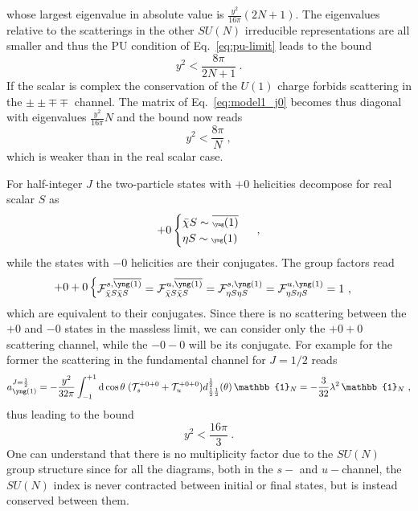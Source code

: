 \documentclass[a4paper,11pt]{article}
\newcommand{\be}{\begin{equation}}
\newcommand{\ee}{\end{equation}}
\newcommand{\nn}{\nonumber}
\begin{document}
whose largest eigenvalue in absolute value is $\frac{y^2}{16\pi}(2N+1)$. The eigenvalues relative to the scatterings in the other $SU(N)$ irreducible representations are all smaller and thus the PU condition of Eq.~\eqref{eq:pu-limit}  leads to the bound
\be
y^2 < \frac{8\pi}{2N+1}\ .
\ee
If the scalar is complex the conservation of the $U(1)$ charge forbids scattering in the $\pm\pm\mp\mp$ channel. The matrix of Eq.~\eqref{eq:model1_j0} becomes thus diagonal with eigenvalues $\frac{y^2}{16\pi} N$ and the bound now reads
\be\label{eq:model1_J0_complex}
y^2 < \frac{8 \pi}{N} \ ,
\ee
which is weaker than in the real scalar case. 

For half-integer $J$ the two-particle states with $+0$ helicities decompose for real scalar $S$ as
\be
+0
\begin{cases}
 \bar\chi S  \sim {\overline{{\tiny{\yng(1)}}}} \nn \\
 \eta S \sim {\tiny{\yng(1)}}
\end{cases}  \ ,
\ee
while the states with $-0$ helicities are their conjugates. The group factors read
\begin{align}\label{eq:group_model1_J12}
+0+0
\begin{cases}
{\cal F}^{s,{{\overline{\tiny{\yng(1)}}}}}_{\bar \chi S \bar \chi S} = {\cal F}^{u,{\overline{\tiny{\yng(1)}}}}_{\bar\chi S \bar\chi S} = {\cal F}^{s,{\tiny{\yng(1)}}}_{\eta S \eta S} = {\cal F}^{u,{\tiny{\yng(1)}}}_{\eta S \eta S} = 1 \ ,
\end{cases}
\end{align}
which are equivalent to their conjugates.
Since there is no scattering between the $+0$ and $-0$ states in the massless limit, we can consider only the $+0+0$ scattering channel, while the $-0-0$ will be its conjugate. 
For example for the former the scattering 
in the fundamental channel for $J=1/2$ reads
\be\label{eq:model1_j12}
a^{J=\frac{1}{2}}_{{\tiny{\yng(1)}}} =
-\frac{y^2}{32\pi}
 \int_{-1}^{+1}{\rm d}\cos\theta \;
({\cal T}_s^{+0+0} + {\cal T}_u^{+0+0})
d^\frac{1}{2}_{\frac{1}{2}\frac{1}{2}}(\theta)
 \, {\mathbb{1}}_N  = -  \frac{3}{32}\lambda^2 \,{\mathbb{1}}_N \ ,
\ee
thus leading to the bound
\be
y^2 < \frac{16\pi}{3} \ .
\ee
One can understand that there is no multiplicity factor due to the $SU(N)$ group structure since for all the diagrams, both in the $s-$ and $u-$channel, the $SU(N)$ index is never contracted between initial or final states, but is instead conserved between them.
\end{document}
